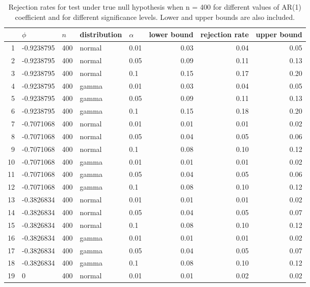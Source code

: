 \begin{table}[ht]
\centering
\caption{Rejection rates for test under true null hypothesis
                   when n = 400 for 
                   different values of AR(1) coefficient and for different 
                   significance levels. Lower and upper bounds are also 
                   included.} 
\label{table:rr_400}
\begin{tabular}{rllllrrr}
  \hline
 & $\phi$ & $n$ & distribution & $\alpha$ & lower bound & rejection rate & upper bound \\ 
  \hline
1 & -0.9238795 & 400 & normal & 0.01 & 0.03 & 0.04 & 0.05 \\ 
  2 & -0.9238795 & 400 & normal & 0.05 & 0.09 & 0.11 & 0.13 \\ 
  3 & -0.9238795 & 400 & normal & 0.1 & 0.15 & 0.17 & 0.20 \\ 
  4 & -0.9238795 & 400 & gamma & 0.01 & 0.03 & 0.04 & 0.05 \\ 
  5 & -0.9238795 & 400 & gamma & 0.05 & 0.09 & 0.11 & 0.13 \\ 
  6 & -0.9238795 & 400 & gamma & 0.1 & 0.15 & 0.18 & 0.20 \\ 
  7 & -0.7071068 & 400 & normal & 0.01 & 0.01 & 0.01 & 0.02 \\ 
  8 & -0.7071068 & 400 & normal & 0.05 & 0.04 & 0.05 & 0.06 \\ 
  9 & -0.7071068 & 400 & normal & 0.1 & 0.08 & 0.10 & 0.12 \\ 
  10 & -0.7071068 & 400 & gamma & 0.01 & 0.01 & 0.01 & 0.02 \\ 
  11 & -0.7071068 & 400 & gamma & 0.05 & 0.04 & 0.05 & 0.06 \\ 
  12 & -0.7071068 & 400 & gamma & 0.1 & 0.08 & 0.10 & 0.12 \\ 
  13 & -0.3826834 & 400 & normal & 0.01 & 0.01 & 0.01 & 0.02 \\ 
  14 & -0.3826834 & 400 & normal & 0.05 & 0.04 & 0.05 & 0.07 \\ 
  15 & -0.3826834 & 400 & normal & 0.1 & 0.08 & 0.10 & 0.12 \\ 
  16 & -0.3826834 & 400 & gamma & 0.01 & 0.01 & 0.01 & 0.02 \\ 
  17 & -0.3826834 & 400 & gamma & 0.05 & 0.04 & 0.05 & 0.07 \\ 
  18 & -0.3826834 & 400 & gamma & 0.1 & 0.08 & 0.10 & 0.12 \\ 
  19 & 0 & 400 & normal & 0.01 & 0.01 & 0.02 & 0.02 \\ 

\end{tabular}
\end{table}
